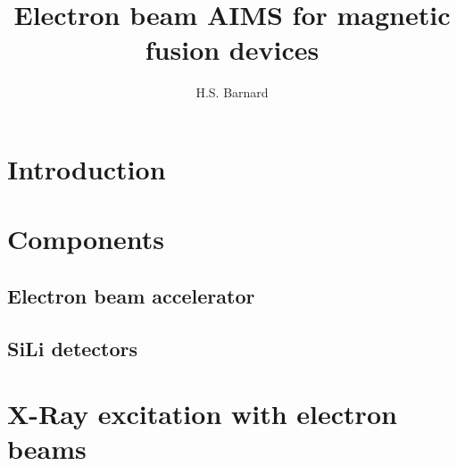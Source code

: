 \documentclass[12pt,letterpaper,final]{article}
\author{H.S. Barnard}
\title{Electron beam AIMS for magnetic fusion devices}
\begin{document}
\maketitle
{}

\section{Introduction}

\section{Components}
\subsection{Electron beam accelerator}
\subsection{SiLi detectors}

\section{X-Ray excitation with electron beams}
\end{document}
